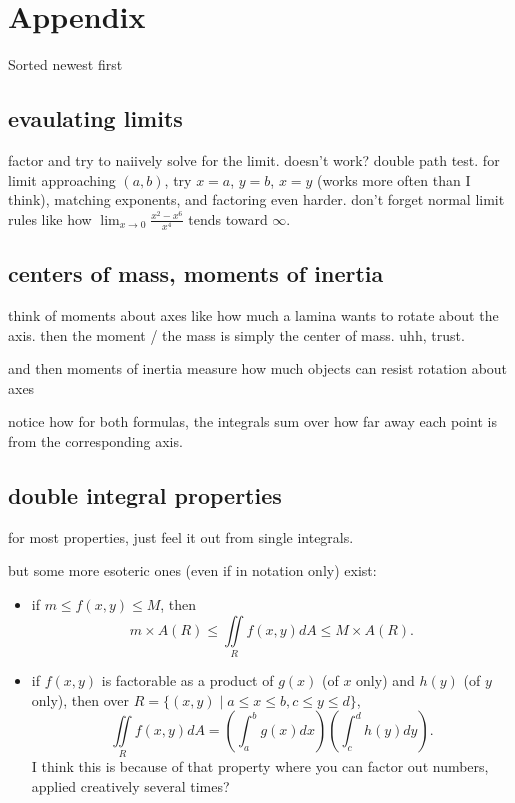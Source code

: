 \documentclass[11pt]{article}
\theoremstyle{definition}
\newcommand{\addsection}[1]{\section*{#1}\addcontentsline{toc}{section}{#1}} %
\newcommand{\col}[1]{\begin{minipage}{\columnwidth}#1\end{minipage}}
\begin{document}


\newpage
\addsection{Appendix} 
Sorted newest first

\subsection*{evaulating limits}
factor and try to naiively solve for the limit. doesn't work? double path test. for limit approaching $(a,b)$, try $x=a$, $y=b$, $x=y$ (works more often than I think), matching exponents, and factoring even harder. don't forget normal limit rules like how $\lim_{x\rightarrow 0}\frac{x^2-x^6}{x^4}$ tends toward $\infty$.

\subsection*{centers of mass, moments of inertia}
think of moments about axes like how much a lamina wants to rotate about the axis. then the moment / the mass is simply the center of mass. uhh, trust.

and then moments of inertia measure how much objects can resist rotation about axes

notice how for both formulas, the integrals sum over how far away each point is from the corresponding axis.
\subsection*{double integral properties}
for most properties, just feel it out from single integrals.

but some more esoteric ones (even if in notation only) exist:
\begin{itemize}
  \item if $m \le f(x,y) \le M$, then
  \[ m\times A(R) \le \iint\limits_R f(x,y)dA \le M \times A(R).\]
  \item if $f(x,y)$ is factorable as a product of $g(x)$ (of $x$ only) and $h(y)$ (of $y$ only), then over $R = \{(x,y) \mid a\le x\le b, c\le y\le d\}$,
  \[\iint\limits_R f(x,y)dA  = \left(\int_{a}^{b}g(x)dx\right)\left(\int_{c}^{d}h(y)dy\right).\]
  I think this is because of that property where you can factor out numbers, applied creatively several times?
\end{itemize}
\end{document}
